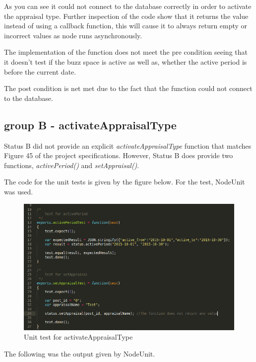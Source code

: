 \documentclass[a4paper,12pt]{article}
\begin{document}
As you can see it could not connect to the database correctly in order to activate the appraisal type. Further inspection of the code show that it returns the value instead of using a callback function, this will cause it to always return empty or incorrect values as node runs asynchronously.

The implementation of the function does not meet the pre condition seeing that it doesn't test if the buzz space is active as well as, whether the active period is before the current date.

The post condition is net met due to the fact that the function could not connect to the database.

\subsection{group B - activateAppraisalType}

Status B did not provide an explicit \textit{activateAppraisalType} function that matches Figure 45 of the project specifications.
However, Status B does provide two functions, \textit{activePeriod()} and \textit{setAppraisal()}.

The code for the unit tests is given by the figure below. For the test, NodeUnit was used.

	\begin{figure}[H]
		\centering
		\includegraphics[width=1.0\textwidth]{Figures/activateAppraisalTypeUnitTests.png}
		\caption{Unit test for activateAppraisalType}
	\end{figure}

The following was the output given by NodeUnit.
\end{document}
